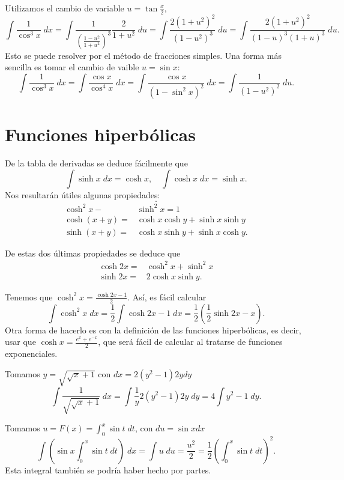 \begin{eg}
\normalfont Utilizamos el cambio de variable $\displaystyle u = \tan \frac{x}{2} $,
\[\int \frac{1}{\cos^{3}x} \; dx = \int \frac{1}{\left(\frac{1-u^{2}}{1+u^{2}}\right)^{3}} \frac{2}{1+u^{2}}\; du = \int \frac{2\left(1+u^{2}\right)^{2}}{\left(1-u^{2}\right)^{3}} \; du = \int \frac{2\left(1+u^{2}\right)^{2}}{\left(1-u\right)^{3}\left(1+u\right)^{3}} \; du.\]
Esto se puede resolver por el método de fracciones simples. Una forma más sencilla es tomar el cambio de vaible $\displaystyle u = \sin x $:
\[\int \frac{1}{\cos^{3}x} \; dx = \int \frac{\cos x}{\cos^{4}x} \; dx = \int \frac{\cos x}{\left(1-\sin ^{2}x\right)^{2}} \; dx = \int \frac{1}{\left(1-u^{2}\right)^{2}} \; du .\]
\end{eg}
\section{Funciones hiperbólicas}
De la tabla de derivadas se deduce fácilmente que
\[\int \sinh x \; dx = \cosh x, \quad \int \cosh x \; dx = \sinh x .\]
Nos resultarán útiles algunas propiedades:
\[ .\]
\[
\begin{split}
	\cosh^{2}x - & \sinh^{2}x = 1 \\
 \cosh\left(x+y\right) = & \cosh x \cosh y + \sinh x \sinh y \\
 \sinh\left(x+y\right) = & \cosh x\sinh y + \sinh x \cosh y.
\end{split}
\]

De estas dos últimas propiedades se deduce que
\[
\begin{split}
	\cosh 2x =& \cosh ^{2}x + \sinh^{2}x \\
	\sinh2x = & 2 \cosh x \sinh y.
\end{split}
\]
\begin{eg}
\normalfont Tenemos que $\displaystyle \cosh^{2}x = \frac{\cosh2x -1}{2} $. Así, es fácil calcular
\[\int \cosh^{2}x \; dx = \frac{1}{2}\int \cosh 2x - 1 \; dx = \frac{1}{2}\left(\frac{1}{2}\sinh2x - x\right).\]
Otra forma de hacerlo es con la definición de las funciones hiperbólicas, es decir, usar que $\displaystyle \cosh x = \frac{e^{x}+e^{-x}}{2} $, que será fácil de calcular al tratarse de funciones exponenciales.
\end{eg}
\begin{eg}
\normalfont Tomamos $\displaystyle y = \sqrt{\sqrt{x}+1} $ con $\displaystyle dx = 2\left(y^{2}-1\right)2ydy $ 
\[\int \frac{1}{\sqrt{\sqrt{x}+1}} \; dx = \int \frac{1}{y}2\left(y^{2}-1\right)2y \; dy = 4\int y^{2}-1 \; dy.\]
\end{eg}
\begin{eg}
\normalfont Tomamos $\displaystyle u = F\left(x\right) = \int^{x}_{0} \sin t \; dt$, con $\displaystyle du = \sin x dx $ 
\[ \int \left(\sin x \int^{x}_{0} \sin t \; dt\right) \; dx = \int u \; du = \frac{u^{2}}{2} = \frac{1}{2}\left(\int^{x}_{0} \sin t \; dt\right)^{2}.\]
Esta integral también se podría haber hecho por partes.
\end{eg}

